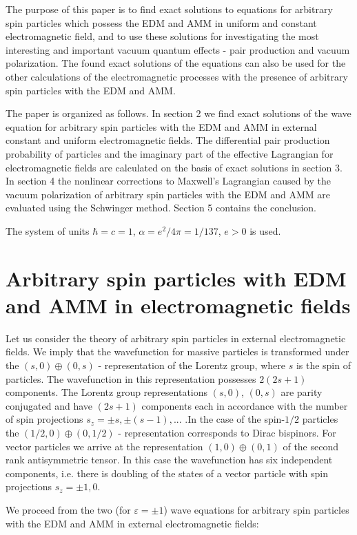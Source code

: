 \documentclass[a4paper,12pt]{article}
\begin{document}
The purpose of this paper is to find exact solutions to equations for
arbitrary spin particles which possess the EDM and AMM in uniform and
constant electromagnetic field, and to use these solutions for investigating
the most interesting and important vacuum quantum effects - pair production
and vacuum polarization. The found exact solutions of the equations can also
be used for the other calculations of the electromagnetic processes with the
presence of arbitrary spin particles with the EDM and AMM.

The paper is organized as follows. In section 2 we find exact solutions of
the wave equation for arbitrary spin particles with the EDM and AMM in
external constant and uniform electromagnetic fields. The differential pair
production probability of particles and the imaginary part of the effective
Lagrangian for electromagnetic fields are calculated on the basis of exact
solutions in section 3. In section 4 the nonlinear corrections to Maxwell's
Lagrangian caused by the vacuum polarization of arbitrary spin particles
with the EDM and AMM are evaluated using the Schwinger method. Section 5
contains the conclusion.

The system of units $\hbar =c=1$, $\alpha =e^2/4\pi =1/137$, $e>0$ is used.

\section{Arbitrary spin particles with EDM and AMM in
electromagnetic fields}

Let us consider the theory of arbitrary spin particles in external
electromagnetic fields. We imply that the wavefunction for massive particles
is transformed under the $(s,0)\oplus (0,s)$ - representation of the Lorentz
group, where $s$ is the spin of particles. The wavefunction in this
representation possesses $2(2s+1)$ components. The Lorentz group
representations $(s,0)$, $(0,s)$ are parity conjugated and have $(2s+1)$
components each in accordance with the number of spin projections $s_z=\pm
s,\pm (s-1),...$ .In the case of the spin-$1/2$ particles the $(1/2,0)\oplus
(0,1/2)$ - representation corresponds to Dirac bispinors. For vector
particles we arrive at the representation $(1,0)\oplus (0,1)$ of the second
rank antisymmetric tensor. In this case the wavefunction has six independent
components, i.e. there is doubling of the states of a vector particle with
spin projections $s_z=\pm 1,0$.

We proceed from the two (for $\varepsilon =\pm 1$) wave equations for
arbitrary spin particles with the EDM and AMM in external electromagnetic
fields:
\end{document}
